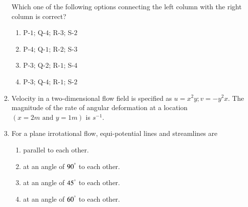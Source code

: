 \documentclass[journal]{IEEEtran}
\begin{document}
\begin{enumerate}
        Which one of the following options connecting the left column with the right column is correct?
        \begin{enumerate}
            \item P-$1$; Q-$4$; R-$3$; S-$2$
            \item P-$4$; Q-$1$; R-$2$; S-$3$
            \item P-$3$; Q-$2$; R-$1$; S-$4$
            \item P-$3$; Q-$4$; R-$1$; S-$2$
        \end{enumerate}

    \item Velocity in a two-dimensional flow field is specified as $u=x^2y;v=-y^2x$. The magnitude of the rate of angular deformation at a location $(x=2m \text{ and } y=1m)$ is \underline{\hspace{1cm}}$s^{-1}$.

    \item For a plane irrotational flow, equi-potential lines and streamlines are
        \begin{enumerate}
            \item parallel to each other.
            \item at an angle of $90^\degree$ to each other.
            \item at an angle of $45^\degree$ to each other.
            \item at an angle of $60^\degree$ to each other.
        \end{enumerate}

    \end{enumerate}
\end{document}

